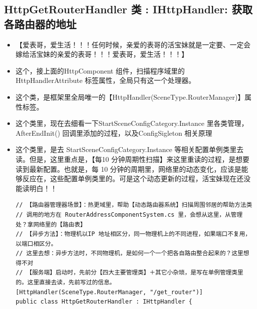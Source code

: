 \documentclass[9pt, b5paper]{article}
\begin{document}
\subsection{HttpGetRouterHandler 类 : IHttpHandler: 获取各路由器的地址}
\label{sec:org5d710c7}
\begin{itemize}
\item 【爱表哥，爱生活！！！任何时候，亲爱的表哥的活宝妹就是一定要、一定会嫁给活宝妹的亲爱的表哥！！！爱表哥，爱生活！！！】
\item 这个，接上面的HttpComponent 组件，扫描程序域里的 HttpHandlerAttribute 标签属性，全局只有这一个处理器。
\item 这个类，是框架里全局唯一的【HttpHandler(SceneType.RouterManager)】属性标签。
\item 这个类里，现在去细看一下StartSceneConfigCategory.Instance 里各类管理，AfterEndInit() 回调里添加的过程，以及ConfigSigleton 相关原理
\item 这个类里，是去 StartSceneConfigCategory.Instance 等相关配置单例类里去读。但是，这里重点是，【每10 分钟周期性扫描】来这里重读的过程，是想要读到最新配置。也就是，每 10 分钟的周期里，网络里的动态变化，应该是能够反应在，这些配置单例类里的。可是这个动态更新的过程，活宝妹现在还没能读明白！！
\begin{verbatim}
// 【路由器管理器场景】：热更域里，帮助【动态路由器系统】扫描周围邻居的帮助方法类
// 调用的地方在 RouterAddressComponentSystem.cs 里，会想从这里，从管理处？拿网络里的【路由表】
// 【异步方法】：物理机以IP 地址相区分，同一物理机上的不同进程，如果端口不复用，以端口相区分。
// 这里去想：异步方法时，不同物理机，是如何一个一个把各自路由整合起来的？这里想得不对
// 【服务端】启动时，先前分【四大主要管理类】＋其它小杂琐，是写在单例管理类里的。这里直接去读，先前写过的信息。
[HttpHandler(SceneType.RouterManager, "/get_router")]
public class HttpGetRouterHandler : IHttpHandler {


\end{verbatim}
\end{itemize}
\end{document}
